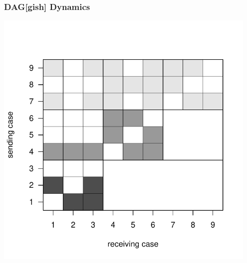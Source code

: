\documentclass[handout]{beamer}
\begin{document}
\begin{frame} \frametitle{DAG[gish] Dynamics}
\centering

\includegraphics[width = 0.95\textwidth,trim= 0cm 0cm 0cm 1.5cm,clip=true  ]{../../../Tex/images/daggish.pdf}

\end{frame}
\end{document}

